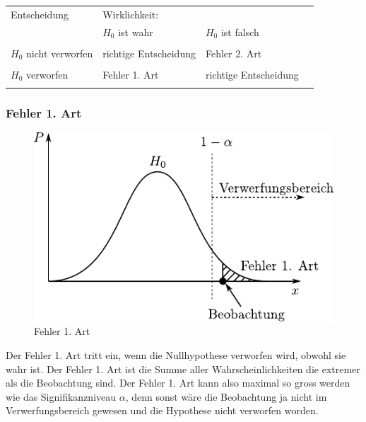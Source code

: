 \begin{table}[h!]
	\centering
	\begin{tabular}{l|lll}
	Entscheidung & Wirklichkeit: & & \\
	& $H_0$ ist wahr & $H_0$ ist falsch \\
	\hline
	&&& \\
	$H_0$ nicht verworfen & richtige Entscheidung & Fehler 2. Art \\
	&&& \\
	$H_0$ verworfen & Fehler 1. Art & richtige Entscheidung \\
	&&& \\
	\end{tabular}
\end{table}

\subsubsection{Fehler 1. Art}

\begin{figure}
        \centering
        \includegraphics[scale=\graphscale]{fehler-erster-art.pdf}
        \caption{Fehler 1. Art}
\end{figure}

Der Fehler 1. Art tritt ein, wenn die Nullhypothese verworfen wird, 
obwohl sie wahr ist. Der Fehler 1. Art ist die Summe aller
Wahrscheinlichkeiten die extremer als die Beobachtung sind.
Der Fehler 1. Art kann also maximal so gross werden wie das
Signifikanzniveau $\alpha$, denn sonst wäre die Beobachtung ja
nicht im Verwerfungsbereich gewesen und die Hypothese nicht 
verworfen worden.

